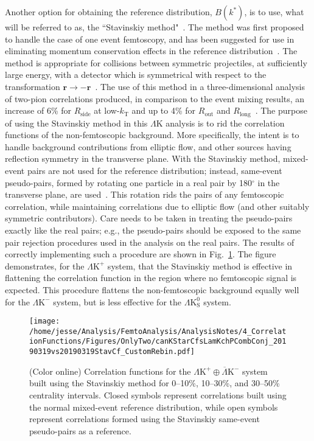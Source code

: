 \documentclass[ALICE,manyauthors]{cernphprep}
\newcommand{\LamK}{$\Lambda$K\xspace}
\newcommand{\LamKchP}{$\Lambda\mathrm{K^{+}}$\xspace}
\newcommand{\LamKchM}{$\Lambda\mathrm{K^{-}}$\xspace}
\newcommand{\LamKs}{$\Lambda\mathrm{K^{0}_{S}}$\xspace}
\begin{document}
Another option for obtaining the reference distribution, $B(k^{*})$, is to use, what will be referred to as, the ``Stavinskiy method"~\cite{Stavinskiy04}.
The method was first proposed to handle the case of one event femtoscopy, and has been suggested for use in eliminating momentum conservation effects in the reference distribution~\cite{Lisa:2005dd}.
The method is appropriate for collisions between symmetric projectiles, at sufficiently large energy, with a detector which is symmetrical with respect to the transformation $\mathbf{r} \rightarrow \mathbf{-r}$~\cite{PhysRevD.82.052001}.
The use of this method in a three-dimensional analysis of two-pion correlations produced, in comparison to the event mixing results, an increase of 6\% for $R_{\mathrm{side}}$ at low-$k_{\mathrm{T}}$ and up to 4\% for $R_{\mathrm{out}}$ and $R_{\mathrm{long}}$~\cite{Aamodt:2011mr}.
The purpose of using the Stavinskiy method in this \LamK analysis is to rid the correlation functions of the non-femtoscopic background.  
More specifically, the intent is to handle background contributions from elliptic flow, and other sources having reflection symmetry in the transverse plane.  
With the Stavinskiy method, mixed-event pairs are not used for the reference distribution; instead, same-event pseudo-pairs, formed by rotating one particle in a real pair by 180$^\circ$ in the transverse plane, are used{\color{blue}~\cite{PhysRevD.82.052001}}.  
This rotation rids the pairs of any femtoscopic correlation, while maintaining correlations due to elliptic flow (and other suitably symmetric contributors).
Care needs to be taken in treating the pseudo-pairs exactly like the real pairs; e.g., the pseudo-pairs should be exposed to the same pair rejection procedures used in the analysis on the real pairs.
The results of correctly implementing such a procedure are shown in Fig.~\ref{fig:StavCfs_Correct_LamKchP}.
The figure demonstrates, for the \LamKchP system, that the Stavinskiy method is effective in flattening the correlation function in the region where no femtoscopic signal is expected.
{\color{blue}This procedure flattens the non-femtoscopic background equally well for the \LamKchM system, but is less effective for the \LamKs system}.

\begin{figure}[h!]
  \centering
  \texttt{[image: /home/jesse/Analysis/FemtoAnalysis/AnalysisNotes/4\_CorrelationFunctions/Figures/OnlyTwo/canKStarCfsLamKchPCombConj\_20190319vs20190319StavCf\_CustomRebin.pdf]}
  \caption[\LamKchP Stavinskiy Correlation Functions]
  {
  (Color online) Correlation functions for the $\Lambda\mathrm{K^{+}}\oplus\overline{\Lambda}\mathrm{K^{-}}$ system built using the Stavinskiy method for 0--10\%, 10--30\%, and 30--50\% centrality intervals.  Closed symbols represent correlations built using the normal mixed-event reference distribution, while open symbols represent correlations formed using the Stavinskiy same-event pseudo-pairs as a reference.
  }
  \label{fig:StavCfs_Correct_LamKchP}
\end{figure} 
\end{document}
